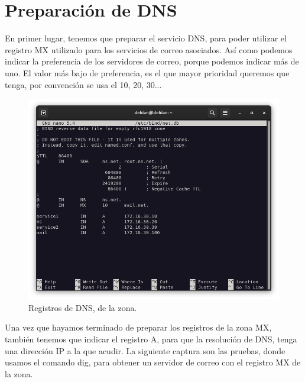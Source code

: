 \section{Preparación de DNS}

En primer lugar, tenemos que preparar el servicio DNS, para poder utilizar el registro MX utilizado para los servicios de correo asociados. Así como podemos indicar la preferencia de los servidores de correo, porque podemos indicar más de uno. El valor más bajo de preferencia, es el que mayor prioridad queremos que tenga, por convención se usa el 10, 20, 30...

\begin{figure}[H]
	\centering
	\includegraphics[scale=0.30]{00}
	\caption{Registros de DNS, de la zona.}
\end{figure}


Una vez que hayamos terminado de preparar los registros de la zona MX, también tenemos que indicar el registro A, para que la resolución de DNS, tenga una dirección IP a la que acudir. La siguiente captura son las pruebas, donde usamos el comando dig, para obtener un servidor de correo con el registro MX de la zona.

